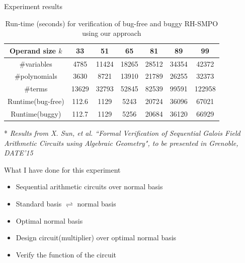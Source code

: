 \documentclass[xcolor=dvipsnames]{beamer}
\newcommand{\bi}{\begin{itemize}}
\newcommand{\ei}{\end{itemize}}
\begin{document}
\begin{frame}{\large{Experiment results}}
\begin{table}[htb]
\centering
\caption{\small Run-time (seconds) for verification of bug-free and
  buggy RH-SMPO using our approach} 
\label{tbl:exp1}  
\begin{tabular}{|c||c|c|c|c|c|c|} 
\hline
Operand size $k$ & 33 & 51 & 65 & 81 & 89 & 99\\
\hline
\#variables & 4785 & 11424 & 18265 & 28512 & 34354 & 42372\\
\hline
\#polynomials & 3630 & 8721 & 13910 & 21789 & 26255 & 32373\\
\hline
\#terms & 13629 & 32793 & 52845 & 82539 & 99591 & 122958\\
\hline
\hline
Runtime(bug-free) & 112.6 & 1129 & 5243 & 20724 & 36096 & 67021\\
\hline
Runtime(buggy) & 112.7 & 1129 & 5256 & 20684 & 36120 & 66929\\
\hline
\end{tabular}
\end{table}
* \textit{Results from X. Sun, et al. ``Formal Verification of Sequential Galois Field Arithmetic 
Circuits using Algebraic Geometry", to be presented in Grenoble, DATE'15}
\end{frame}
\begin{frame}{\large{What I have done for this experiment}}
\bi
\item Sequential arithmetic circuits over normal basis
\item Standard basis $\rightleftharpoons$ normal basis
\item Optimal normal basis
\item Design circuit(multiplier) over optimal normal basis
\item Verify the function of the circuit
\ei
\hyperlink{pptnodetail}{}
\end{frame}
\end{document}
